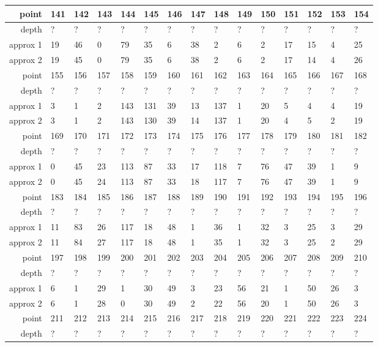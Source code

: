 \begin{center}
\begin{supertabular}{|r|l l l l l l l l l l l l l l|}
\hline
point & 141 & 142 & 143 & 144 & 145 & 146 & 147 & 148 & 149 & 150 & 151 & 152 & 153 & 154 \\
\hline
depth & ? & ? & ? & ? & ? & ? & ? & ? & ? & ? & ? & ? & ? & ? \\
approx 1 & 19 & 46 & 0 & 79 & 35 & 6 & 38 & 2 & 6 & 2 & 17 & 15 & 4 & 25 \\
approx 2 & 19 & 45 & 0 & 79 & 35 & 6 & 38 & 2 & 6 & 2 & 17 & 14 & 4 & 26 \\
\hline
point & 155 & 156 & 157 & 158 & 159 & 160 & 161 & 162 & 163 & 164 & 165 & 166 & 167 & 168 \\
\hline
depth & ? & ? & ? & ? & ? & ? & ? & ? & ? & ? & ? & ? & ? & ? \\
approx 1 & 3 & 1 & 2 & 143 & 131 & 39 & 13 & 137 & 1 & 20 & 5 & 4 & 4 & 19 \\
approx 2 & 3 & 1 & 2 & 143 & 130 & 39 & 14 & 137 & 1 & 20 & 4 & 5 & 2 & 19 \\
\hline
point & 169 & 170 & 171 & 172 & 173 & 174 & 175 & 176 & 177 & 178 & 179 & 180 & 181 & 182 \\
\hline
depth & ? & ? & ? & ? & ? & ? & ? & ? & ? & ? & ? & ? & ? & ? \\
approx 1 & 0 & 45 & 23 & 113 & 87 & 33 & 17 & 118 & 7 & 76 & 47 & 39 & 1 & 9 \\
approx 2 & 0 & 45 & 24 & 113 & 87 & 33 & 18 & 117 & 7 & 76 & 47 & 39 & 1 & 9 \\
\hline
point & 183 & 184 & 185 & 186 & 187 & 188 & 189 & 190 & 191 & 192 & 193 & 194 & 195 & 196 \\
\hline
depth & ? & ? & ? & ? & ? & ? & ? & ? & ? & ? & ? & ? & ? & ? \\
approx 1 & 11 & 83 & 26 & 117 & 18 & 48 & 1 & 36 & 1 & 32 & 3 & 25 & 3 & 29 \\
approx 2 & 11 & 84 & 27 & 117 & 18 & 48 & 1 & 35 & 1 & 32 & 3 & 25 & 2 & 29 \\
\hline
point & 197 & 198 & 199 & 200 & 201 & 202 & 203 & 204 & 205 & 206 & 207 & 208 & 209 & 210 \\
\hline
depth & ? & ? & ? & ? & ? & ? & ? & ? & ? & ? & ? & ? & ? & ? \\
approx 1 & 6 & 1 & 29 & 1 & 30 & 49 & 3 & 23 & 56 & 21 & 1 & 50 & 26 & 3 \\
approx 2 & 6 & 1 & 28 & 0 & 30 & 49 & 2 & 22 & 56 & 20 & 1 & 50 & 26 & 3 \\
\hline
point & 211 & 212 & 213 & 214 & 215 & 216 & 217 & 218 & 219 & 220 & 221 & 222 & 223 & 224 \\
\hline
depth & ? & ? & ? & ? & ? & ? & ? & ? & ? & ? & ? & ? & ? & ? \\

\end{supertabular}
\end{center}
